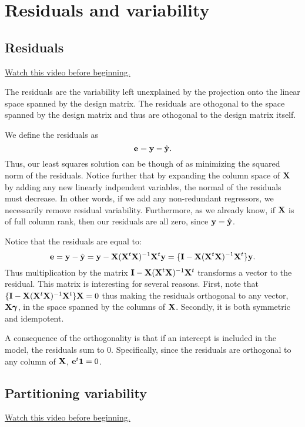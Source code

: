 \chapter{Residuals and variability}

\section{Residuals}

\href{https://www.youtube.com/watch?v=sYFWVRglLLY&index=36&list=PLpl-gQkQivXhdgUCdaUQcdb31CRe8Mm2y}{Watch this video before beginning.}

The residuals are the variability left unexplained by the projection 
onto the linear space spanned by the design matrix. The residuals
are othogonal to the space spanned by the design matrix and thus
are othogonal to the design matrix itself.

We define the residuals as
$$
\mathbf{e} = \mathbf{y} - \hat {\mathbf{y}}.
$$
Thus, our least squares solution can be though of as minimizing
the squared norm of the residuals. Notice further that by
expanding the column space of $\mathbf{X}$ by adding any new
linearly indpendent variables, the normal of the residuals
must decrease. In other words, if we add any non-redundant
regressors, we necessarily remove residual variability. Furthermore,
as we already know, if $\mathbf{X}$ is of full column rank, then our residuals
are all zero, since $\mathbf{y} = \hat {\mathbf{y}}$. 

 Notice that the residuals are equal to:
$$
\mathbf{e} = \mathbf{y} - \hat {\mathbf{y}} = \mathbf{y} - \mathbf{X} (\mathbf{X}^t \mathbf{X})^{-1} \mathbf{X}^t \mathbf{y} = \{\mathbf{I} - \mathbf{X} (\mathbf{X}^t \mathbf{X})^{-1} \mathbf{X}^t\} \mathbf{y}.
$$
Thus multiplication by the matrix $\mathbf{I} - \mathbf{X} (\mathbf{X}^t \mathbf{X})^{-1} \mathbf{X}^t$ transforms a
vector to the residual. This matrix is interesting for several reasons.
First, note that $\{\mathbf{I} - \mathbf{X} (\mathbf{X}^t \mathbf{X})^{-1} \mathbf{X}^t\} \mathbf{X} = 0$ thus making the residuals
orthogonal to any vector, $\mathbf{X} \boldsymbol{\gamma}$, in the space spanned by the
columns of $\mathbf{X}$. Secondly, it is both symmetric and idempotent. 

A consequence of the orthogonality is that if an intercept is
included in the model, the residuals sum to 0. Specifically,
since the residuals are orthogonal to any column of $\mathbf{X}$, 
$\mathbf{e}^t \mathbf{1} = 0$.

\section{Partitioning variability}

\href{https://www.youtube.com/watch?v=uv3yZWGyE2Y&index=37&list=PLpl-gQkQivXhdgUCdaUQcdb31CRe8Mm2y}{Watch this video before beginning.}

